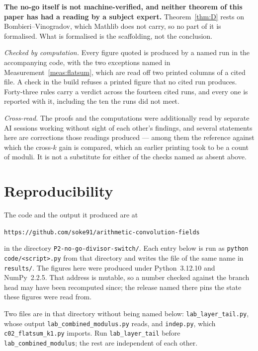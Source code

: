 \documentclass[11pt,a4paper]{article}
\theoremstyle{plain}
\theoremstyle{definition}
\theoremstyle{remark}
\begin{document}
\textbf{The no-go itself is not machine-verified, and neither theorem of
this paper has had a reading by a subject expert.}
Theorem~\ref{thm:D} rests on Bombieri--Vinogradov, which Mathlib does
not carry, so no part of it is formalised. What is formalised is the
scaffolding, not the conclusion.

\emph{Checked by computation.} Every figure quoted is produced by a
named run in the accompanying code, with the two exceptions named in
Measurement~\ref{meas:flatsum}, which are read off two printed columns
of a cited file. A check in the build refuses a printed figure that no
cited run produces. Forty-three rules carry a verdict across the
fourteen cited runs, and every one is reported with it, including the
ten the runs did not meet.

\emph{Cross-read.} The proofs and the computations were additionally
read by separate AI sessions working without sight of each other's
findings, and several statements here are corrections those readings
produced --- among them the reference against which the cross-$k$ gain
is compared, which an earlier printing took to be a count of moduli. It
is not a substitute for either of the checks named as absent above.

\section{Reproducibility}\label{sec:repro}

The code and the output it produced are at

\begin{center}
\texttt{https://github.com/soke91/arithmetic-convolution-fields}
\end{center}

\noindent in the directory \texttt{P2-no-go-divisor-switch/}. Each entry
below is run as \texttt{python code/<script>.py} from that directory and
writes the file of the same name in \texttt{results/}. The figures here
were produced under Python~3.12.10 and NumPy~2.2.5. That address is
mutable, so a number checked against the branch head may have been
recomputed since; the release named there pins the state these figures
were read from.

Two files are in that directory without being named below:
\texttt{lab\_layer\_tail.py}, whose output
\texttt{lab\_combined\_modulus.py} reads, and \texttt{indep.py}, which
\texttt{c02\_flatsum\_k1.py} imports. Run \texttt{lab\_layer\_tail}
before \texttt{lab\_combined\_modulus}; the rest are independent of each
other.
\end{document}
